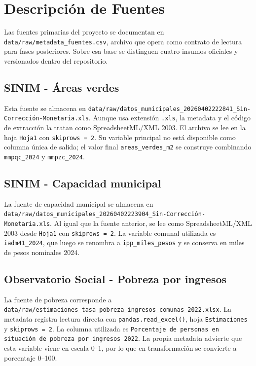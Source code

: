 \chapter{Descripción de Fuentes}

Las fuentes primarias del proyecto se documentan en \texttt{data/raw/metadata\_fuentes.csv}, archivo que opera como contrato de lectura para fases posteriores. Sobre esa base se distinguen cuatro insumos oficiales y versionados dentro del repositorio.



\section{SINIM - Áreas verdes}

Esta fuente se almacena en \texttt{data/raw/datos\_municipales\_20260402222841\_Sin-Corrección-Monetaria.xls}. Aunque usa extensión \texttt{.xls}, la metadata y el código de extracción la tratan como SpreadsheetML/XML 2003. El archivo se lee en la hoja \texttt{Hoja1} con \texttt{skiprows = 2}. Su variable principal no está disponible como columna única de salida; el valor final \texttt{areas\_verdes\_m2} se construye combinando \texttt{mmpqc\_2024} y \texttt{mmpzc\_2024}.

\section{SINIM - Capacidad municipal}

La fuente de capacidad municipal se almacena en \texttt{data/raw/datos\_municipales\_20260402223904\_Sin-Corrección-Monetaria.xls}. Al igual que la fuente anterior, se lee como SpreadsheetML/XML 2003 desde \texttt{Hoja1} con \texttt{skiprows = 2}. La variable comunal utilizada es \texttt{iadm41\_2024}, que luego se renombra a \texttt{ipp\_miles\_pesos} y se conserva en miles de pesos nominales 2024.

\section{Observatorio Social - Pobreza por ingresos}

La fuente de pobreza corresponde a \texttt{data/raw/estimaciones\_tasa\_pobreza\_ingresos\_comunas\_2022.xlsx}. La metadata registra lectura directa con \texttt{pandas.read\_excel()}, hoja \texttt{Estimaciones} y \texttt{skiprows = 2}. La columna utilizada es \texttt{Porcentaje de personas en situación de pobreza por ingresos 2022}. La propia metadata advierte que esta variable viene en escala 0--1, por lo que en transformación se convierte a porcentaje 0--100.

